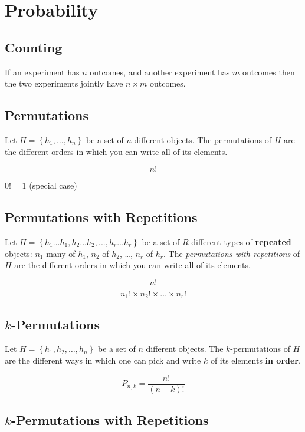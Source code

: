 \section{Probability}

\subsection*{Counting}

If an experiment has $n$ outcomes, and another experiment has $m$ outcomes then the two experiments jointly have $n\times m$ outcomes.

\subsection*{Permutations}

Let $H = \left\{h_1, \dots, h_n\right\}$ be a set of $n$ different objects. The permutations of $H$ are the different orders in which you can write all of its elements.

$$ n! $$

$ 0! = 1 $ (special case)

\subsection*{Permutations with Repetitions}

Let $H = \left\{h_1...h_1,h_2...h_2,...,h_r...h_r \right\}$ be a set of $R$ different types of \textbf{repeated} objects: $n_1$ many of $h_1$, $n_2$ of $h_2$, \dots, $n_r$ of $h_r$. The \textit{permutations with repetitions} of $H$ are the different orders in which you can write all of its elements.

$$ \frac{n!}{n_1! \times n_2! \times \ldots \times n_r!} $$

\subsection*{$k$-Permutations}

Let $H = \left\{h_1, h_2, \dots, h_n\right\}$ be a set of $n$ different objects. The $k$-permutations of $H$ are the different ways in which one can pick and write $k$ of its elements \textbf{in order}.

$$ P_{n,k} = \frac{n!}{(n-k)!} $$

\subsection*{$k$-Permutations with Repetitions}

